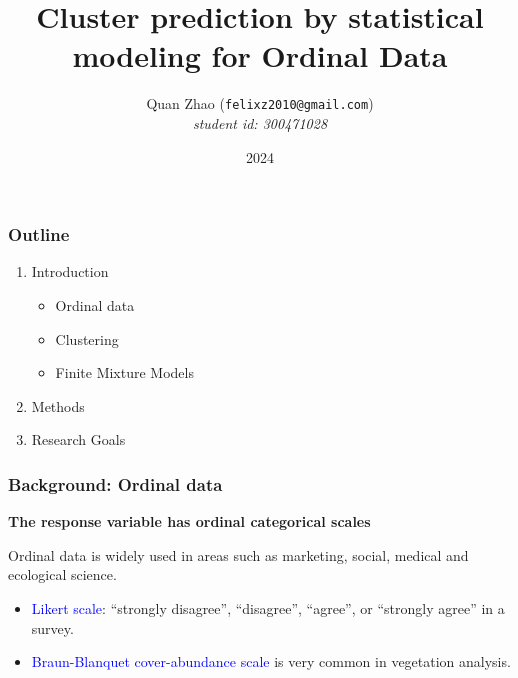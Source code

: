 \documentclass[xcolor=svgnames]{beamer}
\begin{document}
\title{Cluster prediction by statistical modeling for Ordinal Data}
\author{Quan Zhao ({\tt felixz2010@gmail.com})\\[1em]
{\em student id: 300471028}\\[1em]
}

\date{2024}


\begin{frame}\frametitle{
}
\titlepage
\end{frame}


\begin{frame}\frametitle{Outline}

\begin{enumerate}
\item Introduction
\begin{itemize}
\item Ordinal data
\item Clustering
\item Finite Mixture Models
\end{itemize}
\item Methods
\item Research Goals
\end{enumerate}

\end{frame}

\begin{frame}\frametitle{Background: Ordinal data}

{\bf The response variable has ordinal categorical scales}

Ordinal data is widely used in areas such as marketing, social, medical and ecological science.

\begin{itemize}
\pause
\item  \textcolor{blue}{Likert scale}:  ``strongly disagree'', ``disagree'', ``agree'', or ``strongly agree'' in a survey.
\pause
\item \textcolor{blue}{Braun-Blanquet cover-abundance scale} is very common in vegetation analysis. 
\end{itemize}

\end{frame}
\end{document}
